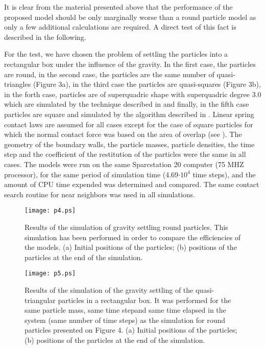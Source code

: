 \documentclass[granma]{svjour}
\begin{document}
It is clear from the material presented above that the performance of the
proposed model should be only marginally worse than a round particle model as
only a few additional calculations are required. A direct test of this fact
is described in the following.

For the test, we have chosen the problem of settling the particles into a
rectangular box under the influence of the gravity. In the first case, the
particles are round, in the second case, the particles are the same number of
quasi-triangles (Figure 3a), in the third case the particles are
quasi-squares (Figure 3b), in the forth case, particles are of superquadric
shape with superquadric degree 3.0 which are simulated by the technique
described in \cite{must93} and finally, in the fifth case
particles are
square and simulated by the algorithm described in \cite{hop92}.
Linear spring contact laws are assumed for all cases except for the case of
square particles for which the normal contact force was based on the area of
overlap (see \cite{hop92}). The geometry of the boundary walls,
the
particle masses, particle densities, the time step and the coefficient of the
restitution of the particles were the same in all cases. The models were run
on the same Sparcstation 20 computer (75 MHZ processor), for the same period
of simulation time (4.69$\cdot 10^4$ time steps), and the amount of CPU time
expended was determined and compared. The same contact search routine for
near neighbors \cite{hop92} was used in all simulations.

\begin{figure}
\texttt{[image: p4.ps]}
\caption{Results of the simulation of gravity settling round particles.
This simulation has been performed in order to compare the efficiencies of
the models. (a) Initial positions of the particles; (b) positions of the
particles at the end of the simulation.}\label{fig4}
\end{figure}

\begin{figure}[!t]
\texttt{[image: p5.ps]}
\caption{Results of the simulation of the gravity settling of the
quasi-triangular particles in a rectangular box. It was performed for the
same particle mass, same time stepand same time elapsed in the system (same
number of time steps) as the simulation for round particles presented on
Figure 4. (a) Initial positions of the particles; (b) positions of the
particles at the end of the simulation.}\label{fig5}
\end{figure}
\end{document}
